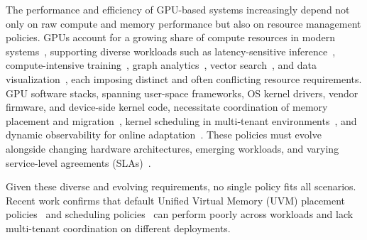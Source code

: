 The performance and efficiency of GPU-based systems increasingly depend not only on raw compute and memory performance but also on resource management policies. GPUs account for a growing share of compute resources in modern systems~\cite{jeon2019analysis}, supporting diverse workloads such as latency-sensitive inference~\cite{kwon2023efficient,agrawal2024taming,yu2024orca}, compute-intensive training~\cite{shoeybi2019megatron,rasley2020deepspeed}, graph analytics~\cite{lin2024towards,chen2020pangolin,wang2016gunrock}, vector search~\cite{pan2024survey,cao2023gpu}, and data visualization~\cite{moreland2016vtk}, each imposing distinct and often conflicting resource requirements. GPU software stacks, spanning user-space frameworks, OS kernel drivers, vendor firmware, and device-side kernel code, necessitate coordination of memory placement and migration~\cite{sun2024llumnix,zhong2024distserve,patel2024splitwise,strati2024orion,sheng2023flexgen}, kernel scheduling in multi-tenant environments~\cite{fu2024serverlessllm,shubha2024usher,hu2023lucid,li2022miso,jayaram2023sia,xiao2018gandiva,narayanan2020heterogeneity}, and dynamic observability for online adaptation~\cite{agrawal2024vidur}. These policies must evolve alongside changing hardware architectures, emerging workloads, and varying service-level agreements (SLAs)~\cite{kwon2023efficient,yu2020fine,delimitrou2013paragon,delimitrou2014quasar,lo2015heracles,qiao2021pollux}.

Given these diverse and evolving requirements, no single policy fits all scenarios. Recent work confirms that default Unified Virtual Memory (UVM) placement policies~\cite{wang2024suv,lin2025forest,kim2025dream,liao2024svm,park2025helm} and scheduling policies~\cite{wang2024gcaps,fan2025gpreempt,kato2011timegraph,shen2025xsched} can perform poorly across workloads and lack multi-tenant coordination on different deployments.

